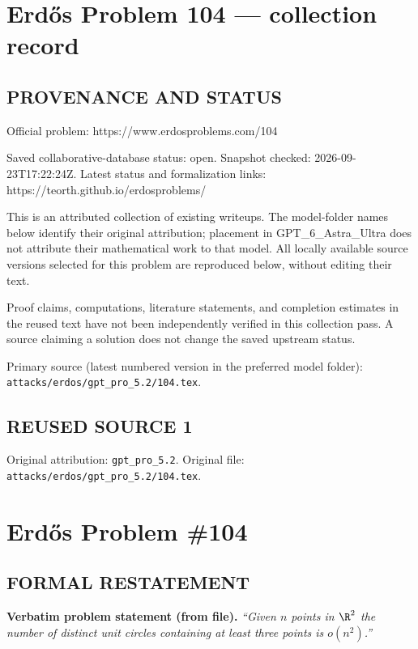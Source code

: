\section*{Erd\H{o}s Problem 104 --- collection record}

\subsection*{PROVENANCE AND STATUS}
Official problem: https://www.erdosproblems.com/104

Saved collaborative-database status: open.
Snapshot checked: 2026-09-23T17:22:24Z.
Latest status and formalization links: https://teorth.github.io/erdosproblems/

This is an attributed collection of existing writeups. The model-folder names below identify their original attribution; placement in GPT\_6\_Astra\_Ultra does not attribute their mathematical work to that model. All locally available source versions selected for this problem are reproduced below, without editing their text.

Proof claims, computations, literature statements, and completion estimates in the reused text have not been independently verified in this collection pass. A source claiming a solution does not change the saved upstream status.

Primary source (latest numbered version in the preferred model folder): \texttt{attacks/erdos/gpt\_pro\_5.2/104.tex}.

\subsection*{REUSED SOURCE 1}
Original attribution: \texttt{gpt\_pro\_5.2}.
Original file: \texttt{attacks/erdos/gpt\_pro\_5.2/104.tex}.

\section*{Erd\H{o}s Problem \#104}

\subsection*{FORMAL RESTATEMENT}
\noindent\textbf{Verbatim problem statement (from file).}
\emph{``Given $n$ points in $\R^2$ the number of distinct unit circles containing at least three points is $o(n^2)$.''}

